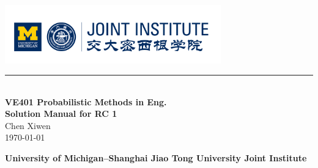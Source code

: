 \documentclass[12pt, a4paper]{article}
\newcommand{\HRule}{\rule{\linewidth}{0.5mm}}
\begin{document}
\renewcommand\arraystretch{1.5}
\setlength\parskip{.1\baselineskip}


\begin{titlepage}
  \begin{center}
  \includegraphics[width=0.7\textwidth]{./logo}\\
  \HRule\\[3cm]

  {\Huge\bfseries VE401 Probabilistic Methods in Eng.\\[0.5cm]Solution Manual for RC 1}\\[2cm]
  
  {\large Chen Xiwen}
  \\[1cm]
  {\large \today}
  \vfill

  \textbf{\small University of Michigan--Shanghai Jiao Tong University Joint Institute}
  \end{center}
\end{titlepage}


\newpage

\begin{spacing}{1.1}




  
\end{spacing}
\end{document}
